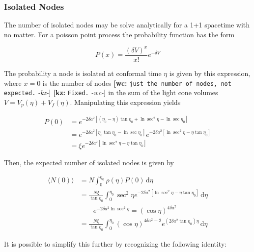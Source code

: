 \documentclass[preprint,notitlepage,amsmath,amssymb,floatfix]{revtex4-1}
\newcommand{\XXX}[3]{{\bf [#1: } {\tt #3} {\it -#2-}{\bf ]}}
\begin{document}
\subsubsection{Isolated Nodes}
The number of isolated nodes may be solve analytically for a 1+1 spacetime with no matter.  For a poisson point process the probability function has the form

\begin{equation}
P(x) = \frac{\left(\delta V\right)^x}{x!}e^{-\delta V}
\end{equation}

\noindent The probability a node is isolated at conformal time $\eta$ is given by this expression, where $x=0$ is the number of nodes \XXX{wc}{kz}{just the number of nodes, not expected.} \XXX{kz}{wc}{Fixed.} in the sum of the light cone volumes $V=V_p\left(\eta\right)+V_f\left(\eta\right)$.  
Manipulating this expression yields

\begin{equation}
\begin{split}
P\left(0\right) &= e^{-2\delta a^2\left[\left(\eta_0-\eta\right)\tan\eta_0 + \ln\sec^2\eta - \ln\sec\eta_0\right]} \\
  &= e^{-2\delta a^2\left[\eta_0\tan\eta_0 - \ln\sec\eta_0\right]}e^{-2\delta a^2\left[\ln\sec^2\eta - \eta\tan\eta_0\right]} \\
  &=\xi e^{-2\delta a^2\left[\ln\sec^2\eta-\eta\tan\eta_0\right]}
\end{split}
\end{equation}

\noindent Then, the expected number of isolated nodes is given by

\begin{equation}
\begin{split}
\langle N\left(0\right)\rangle &= N\int_0^{\eta_0}\!\rho\left(\eta\right)P\left(0\right)\,\mathrm d\eta \\
  &= \frac{N\xi}{\tan\eta_0}\int_0^{\eta_0}\!\sec^2\eta e^{-2\delta a^2\left[\ln\sec^2\eta - \eta\tan\eta_0\right]}\,\mathrm d\eta \\
  &\qquad e^{-2\delta a^2\ln\sec^2\eta} = \left(\cos\eta\right)^{4\delta a^2} \\
  &= \frac{N\xi}{\tan\eta_0}\int_0^{\eta_0}\left(\cos\eta\right)^{4\delta a^2 - 2} e^{\left(2\delta a^2 \tan\eta_0\right)\eta}\,\mathrm d\eta
\end{split}
\end{equation}

\noindent It is possible to simplify this further by recognizing the following identity:
\end{document}
